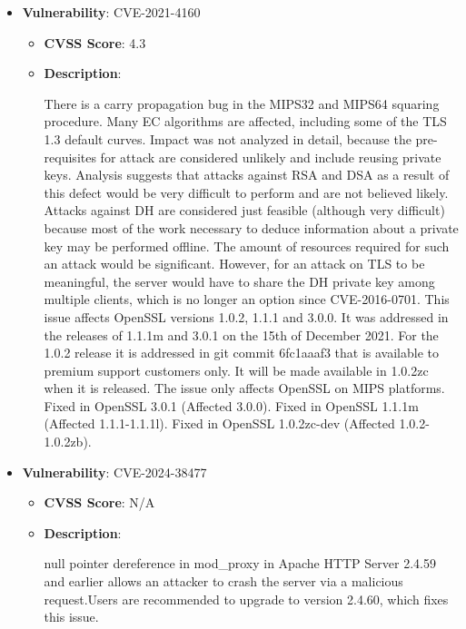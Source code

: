 \documentclass{article}
\begin{document}
\begin{itemize}
        \item \textbf{Vulnerability}: CVE-2021-4160
        \begin{itemize}
            \item \textbf{CVSS Score}:  4.3 
            \item \textbf{Description}:
            \parbox[t]{0.9\linewidth}{
                \ttfamily There is a carry propagation bug in the MIPS32 and MIPS64 squaring procedure. Many EC algorithms are affected, including some of the TLS 1.3 default curves. Impact was not analyzed in detail, because the pre-requisites for attack are considered unlikely and include reusing private keys. Analysis suggests that attacks against RSA and DSA as a result of this defect would be very difficult to perform and are not believed likely. Attacks against DH are considered just feasible (although very difficult) because most of the work necessary to deduce information about a private key may be performed offline. The amount of resources required for such an attack would be significant. However, for an attack on TLS to be meaningful, the server would have to share the DH private key among multiple clients, which is no longer an option since CVE-2016-0701. This issue affects OpenSSL versions 1.0.2, 1.1.1 and 3.0.0. It was addressed in the releases of 1.1.1m and 3.0.1 on the 15th of December 2021. For the 1.0.2 release it is addressed in git commit 6fc1aaaf3 that is available to premium support customers only. It will be made available in 1.0.2zc when it is released. The issue only affects OpenSSL on MIPS platforms. Fixed in OpenSSL 3.0.1 (Affected 3.0.0). Fixed in OpenSSL 1.1.1m (Affected 1.1.1-1.1.1l). Fixed in OpenSSL 1.0.2zc-dev (Affected 1.0.2-1.0.2zb).
            }
        \end{itemize}
    
        \item \textbf{Vulnerability}: CVE-2024-38477
        \begin{itemize}
            \item \textbf{CVSS Score}:  N/A 
            \item \textbf{Description}:
            \parbox[t]{0.9\linewidth}{
                \ttfamily null pointer dereference in mod\_proxy in Apache HTTP Server 2.4.59 and earlier allows an attacker to crash the server via a malicious request.Users are recommended to upgrade to version 2.4.60, which fixes this issue.
            }
        \end{itemize}
    

\end{itemize}
\end{document}
